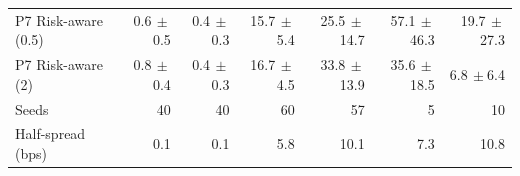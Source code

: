 \begin{table}[!htbp]
{\begin{tabular}{lrrrrrr}
P7 Risk-aware (0.5) & 0.6{\tiny$\,\pm$0.5} & 0.4{\tiny$\,\pm$0.3} & 15.7{\tiny$\,\pm$5.4} & 25.5{\tiny$\,\pm$14.7} & 57.1{\tiny$\,\pm$46.3} & 19.7{\tiny$\,\pm$27.3} \\
P7 Risk-aware (2) & 0.8{\tiny$\,\pm$0.4} & 0.4{\tiny$\,\pm$0.3} & 16.7{\tiny$\,\pm$4.5} & 33.8{\tiny$\,\pm$13.9} & 35.6{\tiny$\,\pm$18.5} & 6.8{\tiny$\,\pm$6.4} \\
\midrule
Seeds & 40 & 40 & 60 & 57 & 5 & 10 \\
Half-spread (bps) & 0.1 & 0.1 & 5.8 & 10.1 & 7.3 & 10.8 \\
\bottomrule
\end{tabular}}
\end{table}
